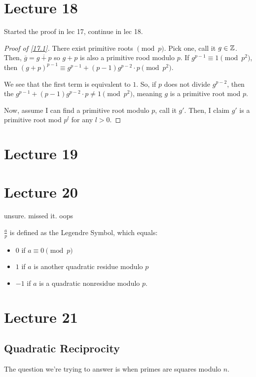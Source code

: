 \documentclass{article}
\begin{document}
\section{Lecture 18}
Started the proof in lec 17, continue in lec 18.
\begin{proof}[Proof of \ref{17.1}]
	There exist primitive roots $\pmod p$. Pick one, call it $g \in \mathbb Z$. Then, $\overline{g} = \overline{g + p}$ so $g + p$ is also a primitive rood modulo $p$. If $g^{p-1} \equiv 1 \pmod{p^2}$, then $(g + p)^{p-1} \equiv g^{p-1} + (p - 1)g^{p-2} \cdot p \pmod{p^2}$.

	We see that the first term is equivalent to $1$. So, if $p$ does not divide $g^{p-2}$, then the $g^{p -1} + (p-1)g^{p-2} \cdot p \neq 1 \pmod{p^2}$, meaning $g$ is a primitive root mod $p$.

	Now, assume I can find a primitive root modulo $p$, call it $g'$. Then, I claim $g'$ is a primitive root mod $p^l$ for any $l > 0$.
\end{proof}

\section{Lecture 19}

\section{Lecture 20}
unsure. missed it. oops

\begin{definition} 
	$\frac{a}{p}$ is defined as the Legendre Symbol, which equals:
	\begin{itemize}
		\item $0$ if $a \equiv 0 \pmod p$
		\item $1$ if $a$ is another quadratic residue modulo $p$
		\item $-1$ if $a$ is a quadratic nonresidue modulo $p$.
	\end{itemize}
\end{definition}

\section{Lecture 21}
\subsection{Quadratic Reciprocity}
The question we're trying to answer is when primes are squares modulo $n$.
\end{document}
